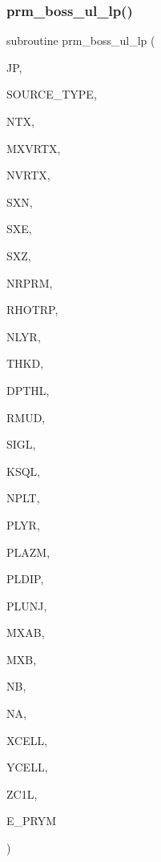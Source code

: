 \subsubsection{\texorpdfstring{prm\+\_\+boss\+\_\+ul\+\_\+lp()}{prm\_boss\_ul\_lp()}}
{\footnotesize\ttfamily subroutine prm\+\_\+boss\+\_\+ul\+\_\+lp (\begin{DoxyParamCaption}\item[{integer}]{JP,  }\item[{integer}]{S\+O\+U\+R\+C\+E\+\_\+\+T\+Y\+PE,  }\item[{integer}]{N\+TX,  }\item[{integer}]{M\+X\+V\+R\+TX,  }\item[{integer, dimension(ntx)}]{N\+V\+R\+TX,  }\item[{real, dimension (mxvrtx,ntx)}]{S\+XN,  }\item[{real, dimension (mxvrtx,ntx)}]{S\+XE,  }\item[{real, dimension(ntx)}]{S\+XZ,  }\item[{integer}]{N\+R\+P\+RM,  }\item[{real, dimension(nrprm)}]{R\+H\+O\+T\+RP,  }\item[{integer}]{N\+L\+YR,  }\item[{real(kind=ql), dimension(nlyr)}]{T\+H\+KD,  }\item[{real(kind=ql), dimension(nlyr)}]{D\+P\+T\+HL,  }\item[{real(kind=ql), dimension(0\+:nlyr)}]{R\+M\+UD,  }\item[{complex(kind=ql), dimension(nlyr)}]{S\+I\+GL,  }\item[{complex(kind=ql), dimension(nlyr)}]{K\+S\+QL,  }\item[{integer}]{N\+P\+LT,  }\item[{integer, dimension(nplt)}]{P\+L\+YR,  }\item[{real, dimension (nplt)}]{P\+L\+A\+ZM,  }\item[{real, dimension (nplt)}]{P\+L\+D\+IP,  }\item[{real, dimension (nplt)}]{P\+L\+U\+NJ,  }\item[{integer}]{M\+X\+AB,  }\item[{integer}]{M\+XB,  }\item[{integer, dimension(nplt)}]{NB,  }\item[{integer, dimension(nplt)}]{NA,  }\item[{real, dimension(mxab,nplt)}]{X\+C\+E\+LL,  }\item[{real, dimension(mxab,nplt)}]{Y\+C\+E\+LL,  }\item[{real, dimension(mxb)}]{Z\+C1L,  }\item[{complex, dimension(2,mxab,ntx,nplt)}]{E\+\_\+\+P\+R\+YM }\end{DoxyParamCaption})}

